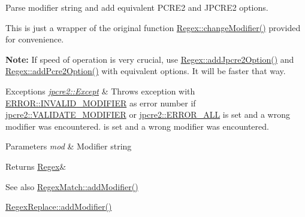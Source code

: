 Parse modifier string and add equivalent P\+C\+R\+E2 and J\+P\+C\+R\+E2 options. 

This is just a wrapper of the original function \hyperlink{classjpcre2_1_1Regex_a9ab3efed9819a51225456e6d8487de56_a9ab3efed9819a51225456e6d8487de56}{Regex\+::change\+Modifier()} provided for convenience.

{\bfseries Note\+:} If speed of operation is very crucial, use \hyperlink{classjpcre2_1_1Regex_a03974fa7ba8f7c47186cb8d6f54934de_a03974fa7ba8f7c47186cb8d6f54934de}{Regex\+::add\+Jpcre2\+Option()} and \hyperlink{classjpcre2_1_1Regex_a2c7dcf12f26b2b046e147b013c8b5087_a2c7dcf12f26b2b046e147b013c8b5087}{Regex\+::add\+Pcre2\+Option()} with equivalent options. It will be faster that way. 
\begin{DoxyExceptions}{Exceptions}
{\em \hyperlink{classjpcre2_1_1Except}{jpcre2\+::\+Except}} & Throws exception with \hyperlink{namespacejpcre2_1_1ERROR_a4b2998984439438fa9da8d7043909bc2_a4b2998984439438fa9da8d7043909bc2a4115340549b623f4e2da285bf0aa9bff}{E\+R\+R\+O\+R\+::\+I\+N\+V\+A\+L\+I\+D\+\_\+\+M\+O\+D\+I\+F\+I\+ER} as error number if \hyperlink{namespacejpcre2_a85c143271501e383843f45b9999c2f00_a85c143271501e383843f45b9999c2f00a9124b768bcae4d51430aa7f26126f387}{jpcre2\+::\+V\+A\+L\+I\+D\+A\+T\+E\+\_\+\+M\+O\+D\+I\+F\+I\+ER} or \hyperlink{namespacejpcre2_a85c143271501e383843f45b9999c2f00_a85c143271501e383843f45b9999c2f00a6fec35fc9fdd8a606bed430c1816c552}{jpcre2\+::\+E\+R\+R\+O\+R\+\_\+\+A\+LL} is set and a wrong modifier was encountered. is set and a wrong modifier was encountered. \\
\hline
\end{DoxyExceptions}

\begin{DoxyParams}{Parameters}
{\em mod} & Modifier string \\
\hline
\end{DoxyParams}
\begin{DoxyReturn}{Returns}
\hyperlink{classjpcre2_1_1Regex}{Regex}\& 
\end{DoxyReturn}
\begin{DoxySeeAlso}{See also}
\hyperlink{classjpcre2_1_1RegexMatch_a08c2e481fe8b9c001e67733fb4e33972_a08c2e481fe8b9c001e67733fb4e33972}{Regex\+Match\+::add\+Modifier()} 

\hyperlink{classjpcre2_1_1RegexReplace_a06a57430f62058822d48722a2a6425d7_a06a57430f62058822d48722a2a6425d7}{Regex\+Replace\+::add\+Modifier()} 
\end{DoxySeeAlso}
\hypertarget{classjpcre2_1_1Regex_a2c7dcf12f26b2b046e147b013c8b5087_a2c7dcf12f26b2b046e147b013c8b5087}{}\label{classjpcre2_1_1Regex_a2c7dcf12f26b2b046e147b013c8b5087_a2c7dcf12f26b2b046e147b013c8b5087} 
